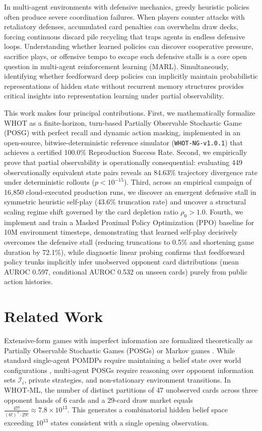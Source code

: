 \documentclass[journal]{IEEEtran}
\begin{document}
In multi-agent environments with defensive mechanics, greedy heuristic policies often produce severe coordination failures. When players counter attacks with retaliatory defenses, accumulated card penalties can overwhelm draw decks, forcing continuous discard pile recycling that traps agents in endless defensive loops. Understanding whether learned policies can discover cooperative pressure, sacrifice plays, or offensive tempo to escape such defensive stalls is a core open question in multi-agent reinforcement learning (MARL). Simultaneously, identifying whether feedforward deep policies can implicitly maintain probabilistic representations of hidden state without recurrent memory structures provides critical insights into representation learning under partial observability.

This work makes four principal contributions. First, we mathematically formalize WHOT as a finite-horizon, turn-based Partially Observable Stochastic Game (POSG) with perfect recall and dynamic action masking, implemented in an open-source, bitwise-deterministic reference simulator (\texttt{WHOT-NG-v1.0.1}) that achieves a certified 100.0\% Reproduction Success Rate. Second, we empirically prove that partial observability is operationally consequential: evaluating 449 observationally equivalent state pairs reveals an 84.63\% trajectory divergence rate under deterministic rollouts ($p < 10^{-15}$). Third, across an empirical campaign of 16,850 cloud-executed production runs, we discover an emergent defensive stall in symmetric heuristic self-play (43.6\% truncation rate) and uncover a structural scaling regime shift governed by the card depletion ratio $\rho_0 > 1.0$. Fourth, we implement and train a Masked Proximal Policy Optimization (PPO) baseline for 10M environment timesteps, demonstrating that learned self-play decisively overcomes the defensive stall (reducing truncations to 0.5\% and shortening game duration by 72.1\%), while diagnostic linear probing confirms that feedforward policy trunks implicitly infer unobserved opponent card distributions (mean AUROC 0.597, conditional AUROC 0.532 on unseen cards) purely from public action histories.

\section{Related Work}
Extensive-form games with imperfect information are formalized theoretically as Partially Observable Stochastic Games (POSGs) \cite{hansen2004dynamic} or Markov games \cite{littman1994markov}. While standard single-agent POMDPs require maintaining a belief state over world configurations \cite{kaelbling1998planning}, multi-agent POSGs require reasoning over opponent information sets $\mathcal{I}_i$, private strategies, and non-stationary environment transitions. In WHOT-ML, the number of distinct partitions of 47 unobserved cards across three opponent hands of 6 cards and a 29-card draw market equals $\frac{47!}{(6!)^3 \cdot 29!} \approx 7.8 \times 10^{13}$. This generates a combinatorial hidden belief space exceeding $10^{13}$ states consistent with a single opening observation.
\end{document}
